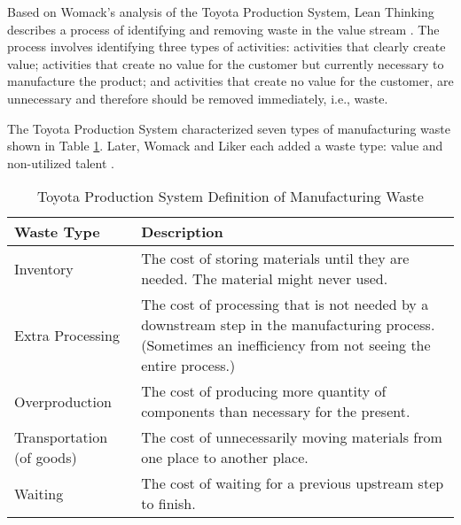 Based on Womack's analysis of the Toyota Production System, Lean Thinking describes a process of identifying and removing waste in the value stream \cite{WomackLeanThinking}. The process involves identifying three types of activities: activities that clearly create value; activities that create no value for the customer but currently necessary to manufacture the product; and activities that create no value for the customer, are unnecessary and therefore should be removed immediately, i.e., waste.

The Toyota Production System characterized seven types of manufacturing waste \cite{ShingoToyotaProductionSystem} shown in Table \ref{ManufacturingWaste}. Later, Womack and Liker each added a waste type: value and non-utilized talent \cite{WomackLeanThinking, LikerToyotaWay}.

\begin{table}[t]
\renewcommand{\arraystretch}{1.5}
\centering
\caption{Toyota Production System Definition of Manufacturing Waste}
\label{ManufacturingWaste}
\begin{tabular}{| >{\raggedright}m{1.15in}|p{2.00in}|}
\hline
Waste Type                & Description                                                                                                                                                  \\ \hline
Inventory                 & The cost of storing materials until they are needed. The material might never used.                                                                   \\ \hline
Extra Processing          & The cost of processing that is not needed by a downstream step in the manufacturing process. (Sometimes an inefficiency from not seeing the entire process.) \\ \hline
Overproduction            & The cost of producing more quantity of components than necessary for the present.                                                                            \\ \hline
Transportation (of goods) & The cost of unnecessarily moving materials from one place to another place.                                                                                  \\ \hline
Waiting                   & The cost of waiting for a previous upstream step to finish.                                                                                                       \\ \hline

\end{tabular}
\end{table}
